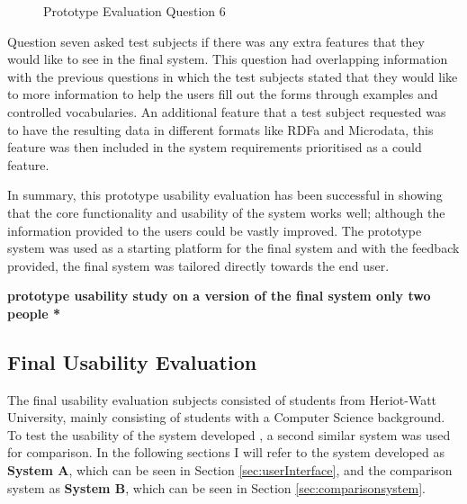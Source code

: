 {\begin{figure}[!h]
  \centering
  \begin{minipage}[b]{0.47\textwidth}
    \caption{Prototype Evaluation Question 6}
    \label{fig:prototypeQuestion6}
  \end{minipage}
\end{figure}
}

Question seven asked test subjects if there was any extra features that they would like to see in the final system. This question had overlapping information with the previous questions in which the test subjects stated that they would like to more information to help the users fill out the forms through examples and controlled vocabularies. An additional feature that a test subject requested was to have the resulting data in different formats like RDFa and Microdata, this feature was then included in the system requirements prioritised as a could feature.

In summary, this prototype usability evaluation has been successful in showing that the core functionality and usability of the system works well; although the information provided to the users could be vastly improved. The prototype system was used as a starting platform for the final system and with the feedback provided, the final system was tailored directly towards the end user.  

\textbf{prototype usability study on a version of the final system only two people *}

\subsection{Final Usability Evaluation}\label{sec:finalUsability}
The final usability evaluation subjects consisted of students from Heriot-Watt University, mainly consisting of students with a Computer Science background. To test the usability of the system developed , a second similar system was used for comparison. In the following sections I will refer to the system developed as \textbf{System A}, which can be seen in Section \ref{sec:userInterface}, and the comparison system as \textbf{System B}, which can be seen in Section \ref{sec:comparisonsystem}.

